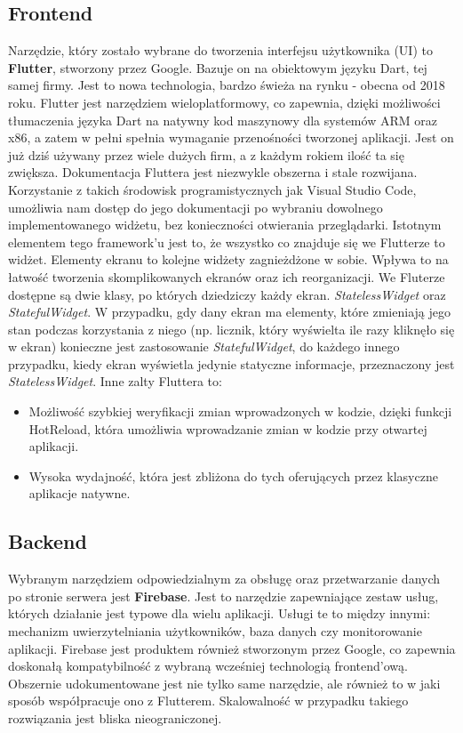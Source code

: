 \subsection{Frontend}
Narzędzie, który zostało wybrane do tworzenia interfejsu użytkownika (UI) to
\textbf{Flutter}, stworzony przez Google. Bazuje on na obiektowym języku Dart,
tej samej firmy. Jest to nowa technologia, bardzo świeża na rynku - obecna od
2018 roku. Flutter jest narzędziem wieloplatformowy, co zapewnia, dzięki
możliwości tłumaczenia języka Dart na natywny kod maszynowy dla systemów ARM
oraz x86, a zatem w pełni spełnia wymaganie przenośności tworzonej aplikacji.
Jest on już dziś używany przez wiele dużych firm, a z każdym rokiem ilość ta się
zwiększa. Dokumentacja Fluttera jest niezwykle obszerna i stale rozwijana.
Korzystanie z takich środowisk programistycznych jak Visual Studio Code,
umożliwia nam dostęp do jego dokumentacji po wybraniu dowolnego implementowanego
widżetu, bez konieczności otwierania przeglądarki. Istotnym elementem tego
framework'u jest to, że wszystko co znajduje się we Flutterze to widżet.
Elementy ekranu to kolejne widżety zagnieżdżone w sobie. Wpływa to na łatwość
tworzenia skomplikowanych ekranów oraz ich reorganizacji. We Fluterze dostępne
są dwie klasy, po których dziedziczy każdy ekran. \textit{StatelessWidget} oraz
\textit{StatefulWidget}. W przypadku, gdy dany ekran ma elementy, które
zmieniają jego stan podczas korzystania z niego (np. licznik, który wyświelta
ile razy kliknęło się w ekran) konieczne jest zastosowanie
\textit{StatefulWidget}, do każdego innego przypadku, kiedy ekran wyświetla
jedynie statyczne informacje, przeznaczony jest \textit{StatelessWidget}. Inne
zalty Fluttera to:
\begin{itemize}
    \item Możliwość szybkiej weryfikacji zmian wprowadzonych w kodzie, dzięki
    funkcji HotReload, która umożliwia wprowadzanie zmian w kodzie przy otwartej
    aplikacji.
    \item Wysoka wydajność, która jest zbliżona do tych oferujących przez
    klasyczne aplikacje natywne.
\end{itemize}

\subsection{Backend}
Wybranym narzędziem odpowiedzialnym za obsługę oraz przetwarzanie danych po
stronie serwera jest \textbf{Firebase}. Jest to narzędzie zapewniające zestaw
usług, których działanie jest typowe dla wielu aplikacji. Usługi te to między
innymi: mechanizm uwierzytelniania użytkowników, baza danych czy monitorowanie
aplikacji. Firebase jest produktem również stworzonym przez Google, co zapewnia
doskonałą kompatybilność z wybraną wcześniej technologią frontend'ową. Obszernie
udokumentowane jest nie tylko same narzędzie, ale również to w jaki sposób
współpracuje ono z Flutterem. Skalowalność w przypadku takiego rozwiązania jest
bliska nieograniczonej.

